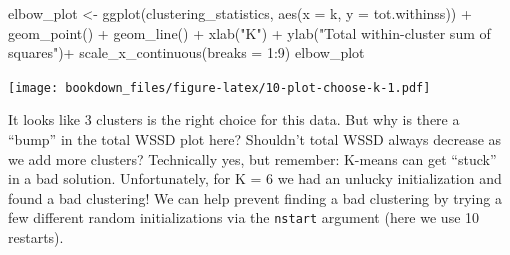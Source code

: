 \documentclass[
]{krantz}
\makeatletter
\newenvironment{Shaded}{\begin{snugshade}}{\end{snugshade}}
\newcommand{\AttributeTok}[1]{\textcolor[rgb]{0.61,0.61,0.61}{#1}}
\newcommand{\DecValTok}[1]{\textcolor[rgb]{0.06,0.06,0.06}{#1}}
\newcommand{\FunctionTok}[1]{\textcolor[rgb]{0,0,0}{#1}}
\newcommand{\NormalTok}[1]{#1}
\newcommand{\OtherTok}[1]{\textcolor[rgb]{0.37,0.37,0.37}{#1}}
\newcommand{\SpecialCharTok}[1]{\textcolor[rgb]{0,0,0}{#1}}
\newcommand{\StringTok}[1]{\textcolor[rgb]{0.5,0.5,0.5}{#1}}
\newenvironment{kframe}{%
\medskip{}
\setlength{\fboxsep}{.8em}
 \def\at@end@of@kframe{}%
 \ifinner\ifhmode%
  \def\at@end@of@kframe{\end{minipage}}%
  \begin{minipage}{\columnwidth}%
 \fi\fi%
 \def\FrameCommand##1{\hskip\@totalleftmargin \hskip-\fboxsep
 \colorbox{shadecolor}{##1}\hskip-\fboxsep
     \hskip-\linewidth \hskip-\@totalleftmargin \hskip\columnwidth}%
 \MakeFramed {\advance\hsize-\width
   \@totalleftmargin\z@ \linewidth\hsize
   \@setminipage}}%
 {\par\unskip\endMakeFramed%
 \at@end@of@kframe}
\renewenvironment{Shaded}{\begin{kframe}}{\end{kframe}}
\makeatother
\begin{document}
\begin{Shaded}
\begin{Highlighting}[]
\NormalTok{elbow\_plot }\OtherTok{\textless{}{-}} \FunctionTok{ggplot}\NormalTok{(clustering\_statistics, }\FunctionTok{aes}\NormalTok{(}\AttributeTok{x =}\NormalTok{ k, }\AttributeTok{y =}\NormalTok{ tot.withinss)) }\SpecialCharTok{+}
  \FunctionTok{geom\_point}\NormalTok{() }\SpecialCharTok{+}
  \FunctionTok{geom\_line}\NormalTok{() }\SpecialCharTok{+}
  \FunctionTok{xlab}\NormalTok{(}\StringTok{"K"}\NormalTok{) }\SpecialCharTok{+}
  \FunctionTok{ylab}\NormalTok{(}\StringTok{"Total within{-}cluster sum of squares"}\NormalTok{)}\SpecialCharTok{+}
  \FunctionTok{scale\_x\_continuous}\NormalTok{(}\AttributeTok{breaks =} \DecValTok{1}\SpecialCharTok{:}\DecValTok{9}\NormalTok{)}
\NormalTok{elbow\_plot}
\end{Highlighting}
\end{Shaded}

\texttt{[image: bookdown\_files/figure-latex/10-plot-choose-k-1.pdf]}

It looks like 3 clusters is the right choice for this data.
But why is there a ``bump'' in the total WSSD plot here? Shouldn't total WSSD always
decrease as we add more clusters? Technically yes, but remember: K-means can
get ``stuck'' in a bad solution. Unfortunately, for K = 6 we had an unlucky initialization
and found a bad clustering! We can help prevent finding a bad clustering by trying a
few different random initializations via the \texttt{nstart} argument (here we use 10 restarts).
\end{document}
